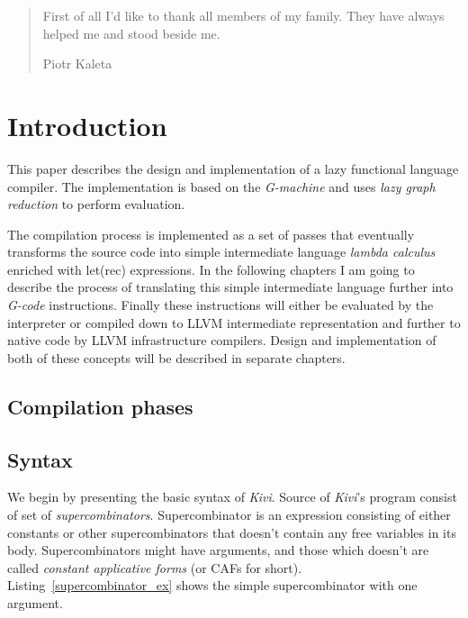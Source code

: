 \documentclass[a4paper]{report}
\begin{document}
\renewcommand{\abstractname}{Acknowledgements}
\begin{abstract}
\normalsize
\center
First of all I'd like to thank all members of my family. They have
always helped me and stood beside me.
\begin{flushright}
Piotr Kaleta
\end{flushright}
\end{abstract}

\normalsize
{}

\tableofcontents

\chapter{Introduction}

This paper describes the design and implementation of a lazy functional
language compiler. The implementation is based on the
\textit{G-machine}\cite{jones87} and uses \textit{lazy graph reduction} to
perform evaluation.

The compilation process is implemented as a set of passes that eventually
transforms the source code into simple intermediate language \textit{lambda
calculus} enriched with let(rec) expressions. In the following chapters I
am going to describe the process of translating this simple intermediate
language further into \textit{G-code} instructions. Finally these
instructions will either be evaluated by the interpreter or compiled down
to LLVM intermediate representation and further to native code by LLVM
infrastructure compilers. Design and implementation of both of these concepts
will be described in separate chapters.

\section{Compilation phases}



\section{Syntax}
We begin by presenting the basic syntax of \textit{Kivi}.
Source of \textit{Kivi}'s program consist of set of
\textit{supercombinators}\cite{wiki:supercombinator}. Supercombinator is an
expression consisting of either constants or other supercombinators that
doesn't contain any free variables in its body. Supercombinators might have
arguments, and those which doesn't are called \textit{constant applicative forms}
(or CAFs for short). Listing~\ref{supercombinator_ex} shows the simple
supercombinator with one argument.
\end{document}
